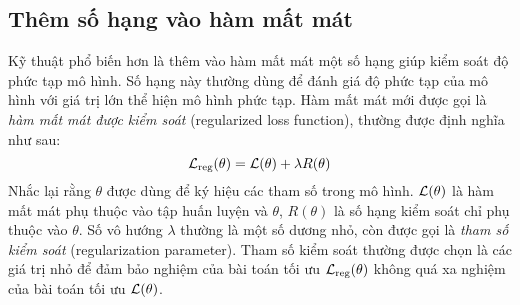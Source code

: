 \subsection{Thêm số hạng vào hàm mất mát}
Kỹ thuật phổ biến hơn là thêm vào hàm mất mát một số hạng giúp
kiểm soát độ phức tạp mô hình. Số hạng này thường dùng để đánh giá độ phức tạp của
mô hình với giá trị lớn thể hiện mô hình phức tạp. {Hàm mất mát mới} được
gọi là \textit{hàm mất mát được kiểm soát} (regularized loss function), thường được định nghĩa như sau:
\begin{equation*}
\mathcal{L}_{\text{reg}}(\theta) = \mathcal{L}(\theta) + \lambda R(\theta)
\end{equation*}
Nhắc lại rằng $\theta$ được dùng để ký hiệu các tham số trong mô hình. $\mathcal{L}(\theta)$ là hàm mất mát phụ thuộc vào tập huấn luyện và $\theta$, $R(\theta)$ là số hạng kiểm soát chỉ phụ thuộc vào $\theta$. Số vô hướng $\lambda$ thường là một số dương nhỏ, còn được gọi là \textit{tham số kiểm soát} (regularization parameter).
Tham số kiểm soát thường được chọn là các giá trị nhỏ để đảm bảo nghiệm
của bài toán tối ưu $\mathcal{L}_{\text{reg}}(\theta)$ không quá xa nghiệm của bài toán
tối ưu $\mathcal{L}(\theta)$.




